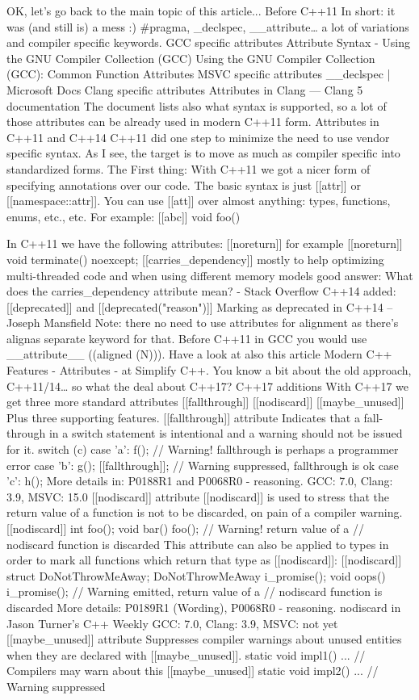 OK, let's go back to the main topic of this article...
Before C++11
In short: it was (and still is) a mess :)
#pragma, _declspec, __attribute… a lot of variations and compiler specific keywords.
GCC specific attributes
Attribute Syntax - Using the GNU Compiler Collection (GCC)
Using the GNU Compiler Collection (GCC): Common Function Attributes
MSVC specific attributes
__declspec | Microsoft Docs
Clang specific attributes
Attributes in Clang — Clang 5 documentation
The document lists also what syntax is supported, so a lot of those attributes can be already used in modern C++11 form.
Attributes in C++11 and C++14
C++11 did one step to minimize the need to use vendor specific syntax. As I see, the target is to move as much as compiler specific into standardized forms.
The First thing:
With C++11 we got a nicer form of specifying annotations over our code.
The basic syntax is just [[attr]] or [[namespace::attr]].
You can use [[att]] over almost anything: types, functions, enums, etc., etc.
For example:
[[abc]] void foo() 
{

}
In C++11 we have the following attributes:
[[noreturn]] 
for example [[noreturn]] void terminate() noexcept;
[[carries_dependency]] 
mostly to help optimizing multi-threaded code and when using different memory models
good answer: What does the carries_dependency attribute mean? - Stack Overflow 
C++14 added:
[[deprecated]] and [[deprecated("reason")]] 
Marking as deprecated in C++14 – Joseph Mansfield
Note: there no need to use attributes for alignment as there’s alignas separate keyword for that. Before C++11 in GCC you would use __attribute__ ((aligned (N))).
Have a look at also this article Modern C++ Features - Attributes - at Simplify C++.
You know a bit about the old approach, C++11/14… so what the deal about C++17?
C++17 additions
With C++17 we get three more standard attributes
[[fallthrough]]
[[nodiscard]]
[[maybe_unused]]
Plus three supporting features.
[[fallthrough]] attribute
Indicates that a fall-through in a switch statement is intentional and a warning should not be issued for it.
switch (c) {
case 'a':
    f(); // Warning! fallthrough is perhaps a programmer error
case 'b':
    g();
[[fallthrough]]; // Warning suppressed, fallthrough is ok
case 'c':
    h();
}
More details in: P0188R1 and P0068R0 - reasoning. 
GCC: 7.0, Clang: 3.9, MSVC: 15.0
[[nodiscard]] attribute
[[nodiscard]] is used to stress that the return value of a function is not to be discarded, on pain of a compiler warning. 
[[nodiscard]] int foo();
void bar() {
    foo(); // Warning! return value of a
           // nodiscard function is discarded
}
This attribute can also be applied to types in order to mark all functions which return that type as [[nodiscard]]:
[[nodiscard]] struct DoNotThrowMeAway{};
DoNotThrowMeAway i_promise();
void oops() {
    i_promise(); // Warning emitted, return value of a   
                 // nodiscard function is discarded
}
More details:
P0189R1 (Wording), 
P0068R0 - reasoning.
nodiscard in Jason Turner’s C++ Weekly
GCC: 7.0, Clang: 3.9, MSVC: not yet
[[maybe_unused]] attribute
Suppresses compiler warnings about unused entities when they are declared with [[maybe_unused]].
static void impl1() { ... } // Compilers may warn about this
[[maybe_unused]] static void impl2() { ... } // Warning suppressed


